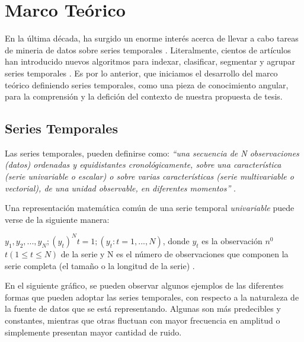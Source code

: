 \section{\textbf{Marco Te\'orico}}
En la \'ultima d\'ecada, ha surgido un enorme inter\'es acerca de llevar a cabo tareas de mineria de datos sobre series temporales \cite{dataminingtimeseries}. Literalmente, cientos de art\'iculos han introducido nuevos algoritmos para indexar, clasificar, segmentar y agrupar series temporales \cite{sigmod}. Es por lo anterior, que iniciamos el desarrollo del marco te\'orico definiendo series temporales, como una pieza de conocimiento angular, para la comprensi\'on y la defici\'on del contexto de nuestra propuesta de tesis.
\subsection{Series Temporales}
Las series temporales, pueden definirse como: \textit{\enquote{una secuencia de N observaciones (datos) ordenadas y equidistantes cronol\'ogicamente, sobre una caracter\'istica (serie univariable o escalar) o sobre varias caracter\'isticas (serie multivariable o vectorial), de una unidad observable, en diferentes momentos}} \cite{tak-chung}.\par
Una representaci\'on matem\'atica com\'un de una serie temporal \textit{univariable} puede verse de la siguiente manera:\par
$y_1, y_2,...,y_N; (y_t)^N t=1; (y_t:t=1,...,N)$, donde $y_t$ es la observaci\'on $n^0$ $t(1 \leq t \leq N)$ de la serie y N es el n\'umero de observaciones que componen la serie completa (el tama\~no o la longitud de la serie) \cite{concepts}.\par
En el siguiente gr\'afico, se pueden observar algunos ejemplos de las diferentes formas que pueden adoptar las series temporales, con respecto a la naturaleza de la fuente de datos que se est\'a representando. Algunas son m\'as predecibles y constantes, mientras que otras fluctuan con mayor frecuencia en amplitud o simplemente presentan mayor cantidad de ruido.
